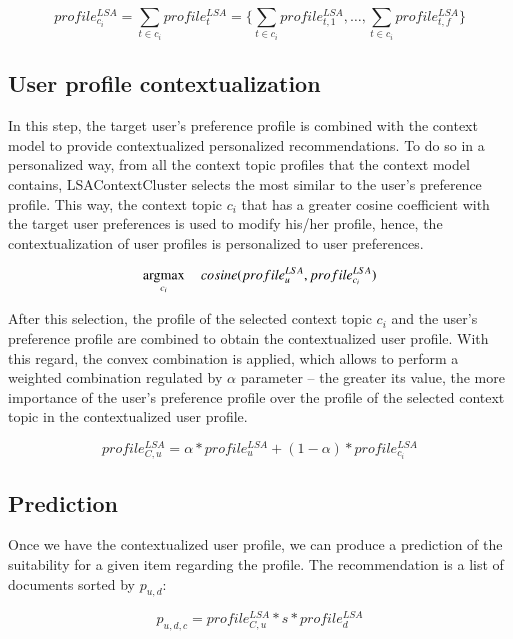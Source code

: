 \documentclass[preprint]{elsarticle}
\newcommand{\argmax}{\operatornamewithlimits{argmax}}
\begin{document}
\begin{spacing}{1.5}
\begin{equation}
	profile^{LSA}_{c_i} = \sum_{t \in c_i} profile^{LSA}_{t}=\{\sum_{t \in c_i} profile^{LSA}_{t,1}, \dots, \sum_{t \in c_i} profile^{LSA}_{t,f} \}
	\label{eq:context-topic-profile}
\end{equation}

\subsection{User profile contextualization}

In this step, the target user's preference profile is combined with the context model to provide contextualized personalized recommendations. To do so in a personalized way, from all the context topic profiles that the context model contains, LSAContextCluster selects the most similar to the user's preference profile. This way, the context topic $c_i$ that has a greater cosine coefficient with the target user preferences is used to modify his/her profile, hence, the contextualization of user profiles is personalized to user preferences.

\begin{equation}
	\argmax_{c_i}~~~~ cosine(profile^{LSA}_u,profile^{LSA}_{c_i})
\end{equation}

After this selection, the profile of the selected context topic $c_i$ and the user's preference profile are combined to obtain the contextualized user profile. With this regard, the convex combination is applied, which allows to perform a weighted combination regulated by $\alpha$ parameter -- the greater its value, the more importance of the user's preference profile over the profile of the selected context topic in the contextualized user profile.

\begin{equation}
	profile^{LSA}_{C,u} = \alpha * profile^{LSA}_u + (1- \alpha )*profile^{LSA}_{c_i}
\end{equation}

\subsection{Prediction}

Once we have the contextualized user profile, we can produce a prediction of the suitability for a given item regarding the profile. The recommendation is a list of documents sorted by $p_{u,d}$:

\begin{equation}
	p_{u,d,c} = profile^{LSA}_{C,u}*s*profile^{LSA}_d
\end{equation}


\end{spacing}
\end{document}
